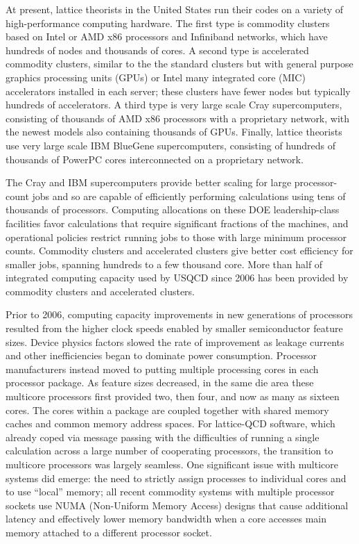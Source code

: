 At present, lattice theorists in the United States run their codes on a
variety of high-performance computing hardware.  The first type is commodity clusters based on Intel or AMD x86
processors and Infiniband networks, which have hundreds of nodes and
thousands of cores.  A second type is accelerated commodity clusters, similar to the the
standard clusters but with general purpose graphics processing units (GPUs) or
Intel many integrated core (MIC) accelerators installed in each server; these
clusters have fewer nodes but typically hundreds of accelerators.  A third type is very
large scale Cray supercomputers, consisting of thousands of AMD x86 processors
with a proprietary network, with the newest models also containing thousands
of GPUs.  Finally, lattice theorists use very large scale IBM BlueGene supercomputers, consisting of
hundreds of thousands of PowerPC cores interconnected on a proprietary
network.

The Cray and IBM supercomputers provide better scaling for large
processor-count jobs and so are capable of efficiently performing calculations
using tens of thousands of processors.  Computing allocations on these DOE
leadership-class facilities favor calculations that require significant
fractions of the machines, and operational policies restrict running jobs to
those with large minimum processor counts.  Commodity clusters and accelerated
clusters give better cost efficiency for smaller jobs, spanning hundreds to a
few thousand core.
More than half of integrated computing capacity used by USQCD
since 2006 has been provided by commodity clusters and accelerated clusters.

Prior to 2006, computing capacity improvements in new generations of
processors resulted from the higher clock speeds enabled by smaller
semiconductor feature sizes.  Device physics factors slowed the rate of
improvement as leakage currents and other inefficiencies began to dominate
power consumption.  Processor manufacturers instead moved to putting multiple
processing cores in each processor package.  As feature sizes decreased, in
the same die area these multicore processors first provided two, then four,
and now as many as sixteen cores.  The cores within a package are coupled
together with shared memory caches and common memory address spaces.  For lattice-QCD
software, which already coped via message passing with the difficulties of
running a single calculation across a large number of cooperating processors,
the transition to multicore processors was largely seamless.  One significant
issue with multicore systems did emerge: the need to strictly assign processes
to individual cores and to use ``local'' memory; all recent commodity systems
with multiple processor sockets use NUMA (Non-Uniform Memory Access) designs
that cause additional latency and effectively lower memory bandwidth when a
core accesses main memory attached to a different processor socket.   

